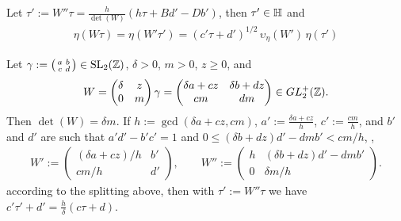 \documentclass{article}
\begin{document}
Let $\tau' := W''\tau = \frac{h}{\det(W)}(h\tau + B d'- D b')$, then
$\tau'\in\mathbb{H}$ and
\begin{gather}
\eta(W\tau) =
\eta(W'\tau') =
(c'\tau+d')^{1/2}\,\upsilon_\eta(W')\,\eta(\tau')
\label{eq:eta-W-transformation}
\end{gather}

\begingroup
\newcommand{\h}{h}
\begin{Lemma}\label{thm:c*tau+d}
  Let $\gamma := \left(
    \begin{smallmatrix}a&b\\c&d\end{smallmatrix} \right)\in
  \SL2Z$, $\delta>0$, $m>0$, $z\ge0$, and
  \begin{gather*}
    W=
    \begin{pmatrix}
      \delta & z\\
      0      & m
    \end{pmatrix}
    \gamma
    = \begin{pmatrix}
        \delta a + c z & \delta b + d z\\
        c m & d m
      \end{pmatrix}
    \in GL_2^+(\mathbb{Z}).
  \end{gather*}
  Then $\det(W)=\delta m$.
  If
  $\h:=\gcd(\delta a + c z, cm)$,
  $a':=\frac{\delta a + c z}{\h}$,
  $c':=\frac{c m}{\h}$, and
  $b'$ and $d'$ are such that $a'd'-b'c'=1$ and
  $0 \le (\delta b + d z) d' - d m b' < cm / \h$, \ie,
  \begin{gather*}
    W':=\begin{pmatrix}
      (\delta a + c z) / \h & b'\\
      c m / \h              & d'
    \end{pmatrix},
    \qquad
    W''
    :=
    \begin{pmatrix}
      \h & (\delta b + d z) d' - d m b'\\
      0  & \delta m / \h
    \end{pmatrix}.
  \end{gather*}
  according to the splitting above,
  then with $\tau':=W''\tau$ we have
  $c'\tau'+d' = \frac{\h}{\delta} (c\tau + d)$.
\end{Lemma}
\end{document}
